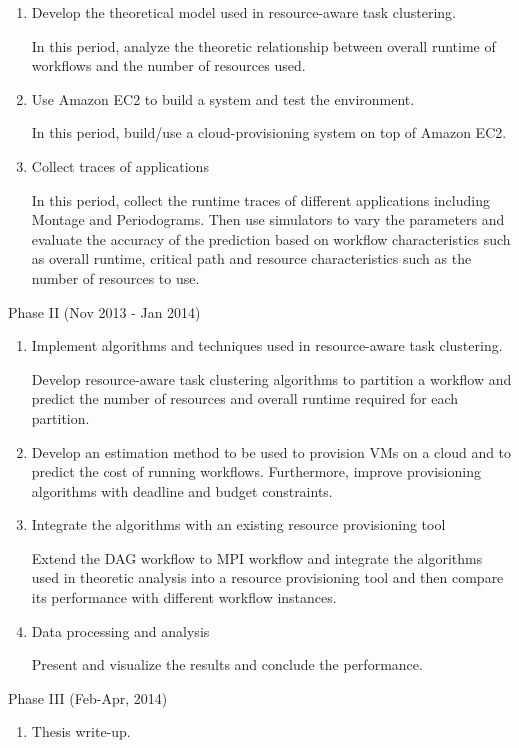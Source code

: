 \begin{enumerate}
\item Develop the theoretical model used in resource-aware task clustering. 

In this period, analyze the theoretic relationship between overall runtime of workflows and the number of resources used. 

\item Use Amazon EC2 to build a system and test the environment. 

In this period, build/use a cloud-provisioning system on top of Amazon EC2. 

\item Collect traces of applications

In this period, collect the runtime traces of different applications including Montage and Periodograms. Then use simulators to vary the parameters and evaluate the accuracy of the prediction based on workflow characteristics such as overall runtime, critical path and resource characteristics such as the number of resources to use. 

\end{enumerate}
Phase II (Nov 2013 - Jan  2014)
\begin{enumerate}
\item Implement algorithms and techniques used in resource-aware task clustering. 

Develop resource-aware task clustering algorithms to partition a workflow and predict the number of resources and overall runtime required for each partition. 

\item Develop an estimation method to be used to provision VMs on a cloud and to predict the cost of running workflows. Furthermore, improve provisioning algorithms with deadline and budget constraints. 

\item Integrate the algorithms with an existing resource provisioning tool 

Extend the DAG workflow to MPI workflow and integrate the algorithms used in theoretic analysis into a resource provisioning tool and then compare its performance with different workflow instances. 

\item Data processing and analysis  

Present and visualize the results and conclude the performance. 
\end{enumerate}
Phase III (Feb-Apr, 2014)

\begin{enumerate}
\item Thesis write-up.
\end{enumerate}